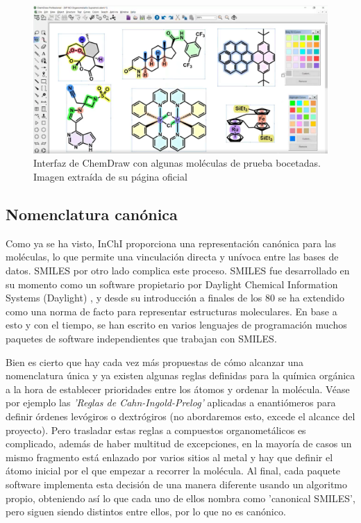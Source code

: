 \begin{figure}[h!]
    \centering
    \includegraphics[scale=0.34]{imagenes/estado_arte/chemdraw.png}
    \caption{Interfaz de ChemDraw con algunas moléculas de prueba bocetadas. Imagen extraída de su página oficial \cite{chemdraw_page}}
    \label{fig:chemdraw}
\end{figure}

\subsection{Nomenclatura canónica}
Como ya se ha visto, InChI proporciona una representación canónica para las moléculas, lo que permite una vinculación directa y unívoca entre las bases de datos. SMILES por otro lado complica este proceso. SMILES fue desarrollado en su momento como un software propietario por Daylight Chemical Information Systems (Daylight) \cite{daylight}, y desde su introducción a finales de los 80 se ha extendido como una norma de facto para representar estructuras moleculares. En base a esto y con el tiempo, se han escrito en varios lenguajes de programación muchos paquetes de software independientes que trabajan con SMILES\cite{opensmiles}.

Bien es cierto que hay cada vez más propuestas de cómo alcanzar una nomenclatura única \cite{weininger_smiles_1989, inchi1, nextmove_software_facto_nodate, baoilleach_we_nodate, universal_smiles} y ya existen algunas reglas definidas para la química orgánica a la hora de establecer prioridades entre los átomos y ordenar la molécula. Véase por ejemplo las \emph{'Reglas de Cahn-Ingold-Prelog'} aplicadas a enantiómeros \cite{cahn_specification_1966, prelog_basic_1982, NOMENCLATURA_R_S} para definir órdenes levógiros o dextrógiros (no abordaremos esto, excede el alcance del proyecto). Pero trasladar estas reglas a compuestos organometálicos es complicado, además de haber multitud de excepciones, en la mayoría de casos un mismo fragmento está enlazado por varios sitios al metal y hay que definir el átomo inicial por el que empezar a recorrer la molécula. Al final, cada paquete software implementa esta decisión de una manera diferente usando un algoritmo propio, obteniendo así lo que cada uno de ellos nombra como 'canonical SMILES', pero siguen siendo distintos entre ellos, por lo que no es canónico.

